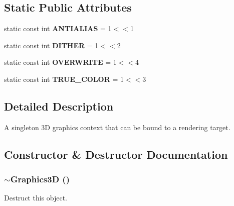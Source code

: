 \subsection*{Static Public Attributes}
\begin{CompactItemize}
\item 
\hypertarget{classm3g_1_1Graphics3D_9df12c5332904e66a962e1bf2809a812}{
static const int \textbf{ANTIALIAS} = 1$<$$<$1}
\label{classm3g_1_1Graphics3D_9df12c5332904e66a962e1bf2809a812}

\item 
\hypertarget{classm3g_1_1Graphics3D_3750f57b82328be988bdab3b672a64f9}{
static const int \textbf{DITHER} = 1$<$$<$2}
\label{classm3g_1_1Graphics3D_3750f57b82328be988bdab3b672a64f9}

\item 
\hypertarget{classm3g_1_1Graphics3D_f448f7f447a301823af9170bfe84c50e}{
static const int \textbf{OVERWRITE} = 1$<$$<$4}
\label{classm3g_1_1Graphics3D_f448f7f447a301823af9170bfe84c50e}

\item 
\hypertarget{classm3g_1_1Graphics3D_bbd22a6baea672f895d5ef32e2438ec6}{
static const int \textbf{TRUE\_\-COLOR} = 1$<$$<$3}
\label{classm3g_1_1Graphics3D_bbd22a6baea672f895d5ef32e2438ec6}

\end{CompactItemize}


\subsection{Detailed Description}
A singleton 3D graphics context that can be bound to a rendering target. 

\subsection{Constructor \& Destructor Documentation}
\hypertarget{classm3g_1_1Graphics3D_9b9347476fc10e57b31694ac8a628511}{
\subsubsection[{$\sim$Graphics3D}]{\setlength{\rightskip}{0pt plus 5cm}$\sim${\bf Graphics3D} ()}}
\label{classm3g_1_1Graphics3D_9b9347476fc10e57b31694ac8a628511}


Destruct this object. 

